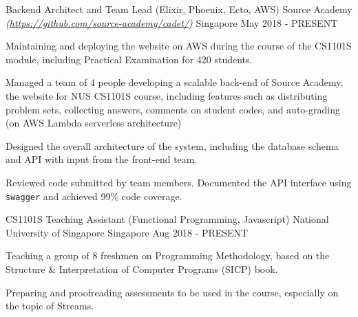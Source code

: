 \begin{cventries}
	\cventry
		{Backend Architect and Team Lead (Elixir, Phoenix, Ecto, AWS)} %
		{Source Academy \textmd{\em\tiny(\url{https://github.com/source-academy/cadet/})}} %
		{Singapore} %
		{May 2018 - PRESENT} %
		{
			\begin{cvitems}
				\item {Maintaining and deploying the website on AWS during the course of the CS1101S module, including Practical Examination for 420 students.}
				\item {Managed a team of 4 people developing a scalable back-end of Source Academy, the website for NUS CS1101S course, including features such as distributing problem sets, collecting answers, comments on student codes, and auto-grading (on AWS Lambda serverless architecture)}
				\item {Designed the overall architecture of the system, including the database schema and API with input from the front-end team.}
				\item {Reviewed code submitted by team members. Documented the API interface using \texttt{swagger} and achieved 99\% code coverage.}
			\end{cvitems}
		}
	\cventry
		{CS1101S Teaching Assistant (Functional Programming, Javascript)} %
		{National University of Singapore} %
		{Singapore} %
		{Aug 2018 - PRESENT} %
		{
			\begin{cvitems}
				\item {Teaching a group of 8 freshmen on Programming Methodology, based on the Structure \& Interpretation of Computer Programs (SICP) book.}
				\item {Preparing and proofreading assessments to be used in the course, especially on the topic of Streams.}
			\end{cvitems}
		}

\end{cventries}
